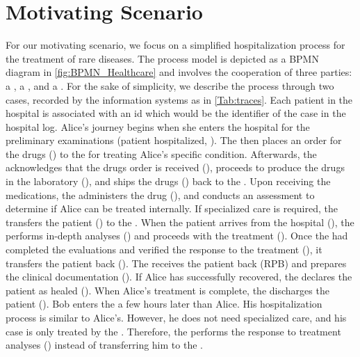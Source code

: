     
\section{Motivating Scenario}\label{sec:motivating}
For our motivating scenario, we focus on a simplified hospitalization process for the treatment of rare diseases.
The process model is depicted as a BPMN diagram in \cref{fig:BPMN_Healthcare} and involves the cooperation of three parties: a , a , and a .
For the sake of simplicity, we describe the process through two cases, recorded by the information systems as in \cref{Tab:traces}. 
Each patient in the hospital is associated with an id which would be the identifier of the case in the hospital log.
Alice's journey %
begins when she enters the hospital for the preliminary examinations (patient hospitalized, ). The  then places an order for the drugs () to the  for  treating Alice's specific condition. Afterwards, the  acknowledges that the drugs order is received (), proceeds to produce the drugs in the laboratory (), and ships the drugs () back to the . Upon receiving the medications, the  administers the drug (), and conducts an assessment to determine if Alice can be treated internally. If specialized care is required, the  transfers the patient () to the . When the patient arrives from the hospital (), the  performs in-depth analyses () and proceeds with the treatment (). Once the  had completed the evaluations and verified the response to the treatment (), it transfers the patient back (). The  receives the patient back \Activ(RPB) and prepares the clinical documentation (). If Alice has successfully recovered, the  declares the patient as healed (). When Alice's treatment is complete, the  discharges the patient (). 
%
Bob %
enters the  a few hours later than Alice. His hospitalization process is similar to Alice's. However, he does not need specialized care, and his case is only treated by the . Therefore, the  performs the response to treatment analyses () instead of transferring him to the . 

